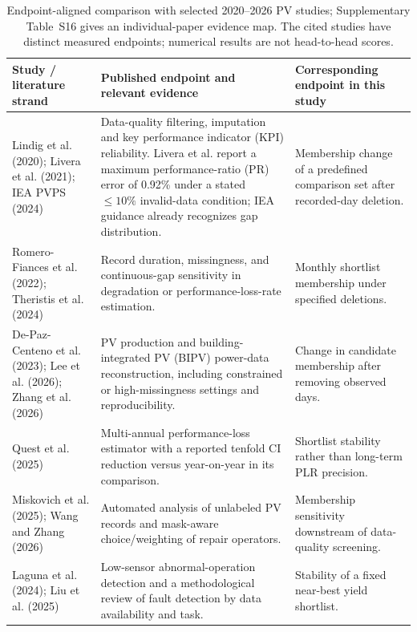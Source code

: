 \documentclass[preprint,12pt]{elsarticle}
\begin{document}
\begin{table}[H]
\centering
\caption{Endpoint-aligned comparison with selected 2020--2026 PV studies; Supplementary Table~S16 gives an individual-paper evidence map. The cited studies have distinct measured endpoints; numerical results are not head-to-head scores.}
\label{tab:literaturecomparison}
\scriptsize
\setlength{\tabcolsep}{3.5pt}
\renewcommand{\arraystretch}{1.08}
\begin{tabular}{L{2.65cm}L{4.85cm}L{4.98cm}}
\toprule
Study / literature strand & Published endpoint and relevant evidence & Corresponding endpoint in this study \\
\midrule
Lindig et al. (2020); Livera et al. (2021); IEA PVPS (2024) \cite{lindig2020,livera2021,ieapvps2024} & Data-quality filtering, imputation and key performance indicator (KPI) reliability. Livera et al. report a maximum performance-ratio (PR) error of 0.92\% under a stated $\leq10\%$ invalid-data condition; IEA guidance already recognizes gap distribution. & Membership change of a predefined comparison set after recorded-day deletion. \\
Romero-Fiances et al. (2022); Theristis et al. (2024) \cite{romero2022,theristis2024} & Record duration, missingness, and continuous-gap sensitivity in degradation or performance-loss-rate estimation. & Monthly shortlist membership under specified deletions. \\
De-Paz-Centeno et al. (2023); Lee et al. (2026); Zhang et al. (2026) \cite{depaz2023,lee2026,zhang2026} & PV production and building-integrated PV (BIPV) power-data reconstruction, including constrained or high-missingness settings and reproducibility. & Change in candidate membership after removing observed days. \\
Quest et al. (2025) \cite{quest2025} & Multi-annual performance-loss estimator with a reported tenfold CI reduction versus year-on-year in its comparison. & Shortlist stability rather than long-term PLR precision. \\
Miskovich et al. (2025); Wang and Zhang (2026) \cite{miskovich2025,wang2026} & Automated analysis of unlabeled PV records and mask-aware choice/weighting of repair operators. & Membership sensitivity downstream of data-quality screening. \\
Laguna et al. (2024); Liu et al. (2025) \cite{laguna2024,liu2025} & Low-sensor abnormal-operation detection and a methodological review of fault detection by data availability and task. & Stability of a fixed near-best yield shortlist. \\

\end{tabular}
\end{table}
\end{document}
